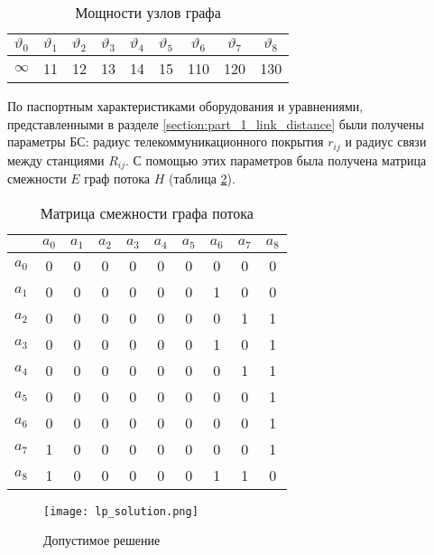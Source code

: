 \begin{table}[h!]\centering
\begin{tabular}{| c| c c c c c |c c c|}\hline
    $\vartheta_0$& $\vartheta_1$& $\vartheta_2$& $\vartheta_3$& $\vartheta_4$& $\vartheta_5$& $\vartheta_6$& $\vartheta_7$ & $\vartheta_8$\\
    \hline
    \hline
    $\infty$ & 11&	12&	13&	14&	15&	110& 120 & 130\\
    \hline
\end{tabular}\caption{Мощности узлов графа}\label{tab:part3_lp_intensity}
\end{table}
   

По паспортным характеристиками оборудования и уравнениями, представленными в разделе \cref{section:part_1_link_distance} были получены параметры БС: радиус телекоммуникационного покрытия $r_{ij}$ и радиус связи между станциями $R_{ij}$. С помощью этих параметров была получена матрица смежности $E$ граф потока $H$ (таблица \cref{tab:part3_lp_adj_mat}).




\begin{table}[h!]\centering
\begin{tabular}{|c|| c| c c c c c| c c c|}\hline
    
    & $a_0$& $a_1$& $a_2$& $a_3$& $a_4$& $a_5$& $a_6$& $a_7$ & $a_8$\\
    \hline
    \hline
    $a_0$ & 0&	0&	0&	0&	0&	0&	0 &	0&	0\\
    \hline
    $a_1$ & 0&	0&	0&	0&	0&	0&	1 &	0&	0\\
    $a_2$ & 0&	0&	0&	0&	0&	0&	0 &	1&	1\\
    $a_3$ & 0&	0&	0&	0&	0&	0&	1 &	0&	1\\
    $a_4$ & 0&	0&	0&	0&	0&	0&	0 &	1&	1\\
    $a_5$ & 0&	0&	0&	0&	0&	0&	0 &	0&	1\\
    \hline
    $a_6$ & 0&	0&	0&	0&	0&	0&	0 &	0&	1\\
    $a_7$ & 1&	0&	0&	0&	0&	0&	0 &	0&	1\\
    $a_8$ & 1&	0&	0&	0&	0&	0&	1 &	1&	0\\
    \hline
\end{tabular}\caption{Матрица смежности графа потока}\label{tab:part3_lp_adj_mat}
\end{table}



\begin{figure}[h!]
    \centering
        \texttt{[image: lp\_solution.png]}
    \caption{Допустимое решение}
    \label{fig:part3_lp_solution}
\end{figure}

